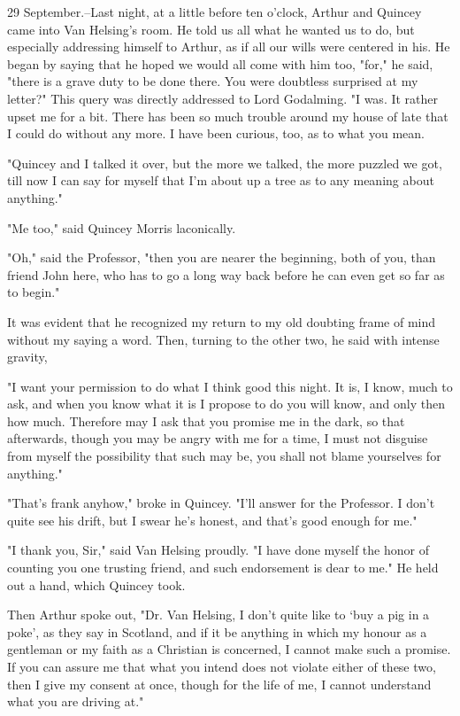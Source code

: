 29 September.--Last night, at a little before ten o'clock, Arthur and Quincey came into Van Helsing's room. He told us all what he wanted us to do, but especially addressing himself to Arthur, as if all our wills were centered in his. He began by saying that he hoped we would all come with him too, "for," he said, "there is a grave duty to be done there. You were doubtless surprised at my letter?" This query was directly addressed to Lord Godalming. "I was. It rather upset me for a bit. There has been so much trouble around my house of late that I could do without any more. I have been curious, too, as to what you mean. 

"Quincey and I talked it over, but the more we talked, the more puzzled we got, till now I can say for myself that I'm about up a tree as to any meaning about anything." 

"Me too," said Quincey Morris laconically. 

"Oh," said the Professor, "then you are nearer the beginning, both of you, than friend John here, who has to go a long way back before he can even get so far as to begin." 

It was evident that he recognized my return to my old doubting frame of mind without my saying a word. Then, turning to the other two, he said with intense gravity, 

"I want your permission to do what I think good this night. It is, I know, much to ask, and when you know what it is I propose to do you will know, and only then how much. Therefore may I ask that you promise me in the dark, so that afterwards, though you may be angry with me for a time, I must not disguise from myself the possibility that such may be, you shall not blame yourselves for anything." 

"That's frank anyhow," broke in Quincey. "I'll answer for the Professor. I don't quite see his drift, but I swear he's honest, and that's good enough for me." 

"I thank you, Sir," said Van Helsing proudly. "I have done myself the honor of counting you one trusting friend, and such endorsement is dear to me." He held out a hand, which Quincey took. 

Then Arthur spoke out, "Dr. Van Helsing, I don't quite like to `buy a pig in a poke', as they say in Scotland, and if it be anything in which my honour as a gentleman or my faith as a Christian is concerned, I cannot make such a promise. If you can assure me that what you intend does not violate either of these two, then I give my consent at once, though for the life of me, I cannot understand what you are driving at." 

